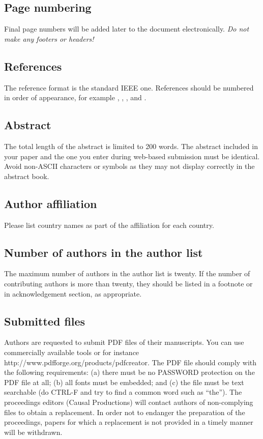 \documentclass[a4paper]{article}
\begin{document}
\subsection{Page numbering}

Final page numbers will be added later to the document electronically. \emph{Do not make any footers or headers!}


\subsection{References}
The reference format \cite{Wiederhofer2017} is the standard IEEE one. References should be numbered in order of appearance, for example \cite{Davis80-COP}, \cite{Rabiner89-ATO}, \cite[pp.\ 417--422]{Hastie09-TEO}, and \cite{YourName21-XXX}.

\subsection{Abstract}

The total length of the abstract is limited to 200 words. The abstract included in your paper and the one you enter during web-based submission must be identical. Avoid non-ASCII characters or symbols as they may not display correctly in the abstract book.

\subsection{Author affiliation}

Please list country names as part of the affiliation for each country.

\subsection{Number of authors in the author list}

The maximum number of authors in the author list is twenty. If the number of contributing authors is more than twenty, they should be listed in a footnote or in acknowledgement section, as appropriate.

\subsection{Submitted files}

Authors are requested to submit PDF files of their manuscripts. You can use commercially available tools or for instance http://www.pdfforge.org/products/pdfcreator. The PDF file should comply with the following requirements: (a) there must be no PASSWORD protection on the PDF file at all; (b) all fonts must be embedded; and (c) the file must be text searchable (do CTRL-F and try to find a common word such as ``the''). The proceedings editors (Causal Productions) will contact authors of non-complying files to obtain a replacement. In order not to endanger the preparation of the proceedings, papers for which a replacement is not provided in a timely manner will be withdrawn.
\end{document}
